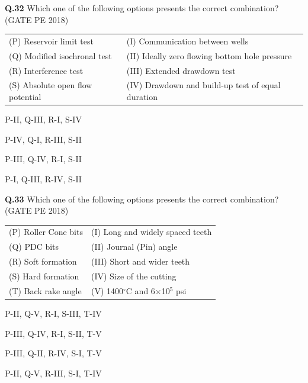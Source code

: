 \documentclass[15pt,a4paper]{article}
\begin{document}
\pagebreak

\noindent\textbf{Q.32} Which one of the following options presents the correct combination? \hfill (GATE PE 2018)

\vspace{0.3cm}

\begin{tabular}{ll}
(P) Reservoir limit test         & (I) Communication between wells \\
(Q) Modified isochronal test     & (II) Ideally zero flowing bottom hole pressure \\
(R) Interference test            & (III) Extended drawdown test \\
(S) Absolute open flow potential & (IV) Drawdown and build-up test of equal duration\\ 
\end{tabular}


\begin{enumerate}
\begin{multicols}{2}
	\item P-II, Q-III, R-I, S-IV \item P-IV, Q-I, R-III, S-II 
	\item P-III, Q-IV, R-I, S-II \item P-I, Q-III, R-IV, S-II 
\end{multicols}
\end{enumerate}

\noindent\textbf{Q.33} Which one of the following options presents the correct combination? \hfill (GATE PE 2018)

\vspace{0.3cm}

\begin{tabular}{ll}
(P) Roller Cone bits    & (I) Long and widely spaced teeth \\
(Q) PDC bits            & (II) Journal (Pin) angle \\
(R) Soft formation      & (III) Short and wider teeth \\
(S) Hard formation      & (IV) Size of the cutting \\
(T) Back rake angle     & (V) 1400$^\circ$C and 6$\times$10$^5$ psi \\
\end{tabular}



\begin{enumerate} 
\begin{multicols}{2}
\item P-II, Q-V, R-I, S-III, T-IV \item P-III, Q-IV, R-I, S-II, T-V \\
\item P-III, Q-II, R-IV, S-I, T-V \item P-II, Q-V, R-III, S-I, T-IV \\
\end{multicols}
\end{enumerate}
\end{document}
